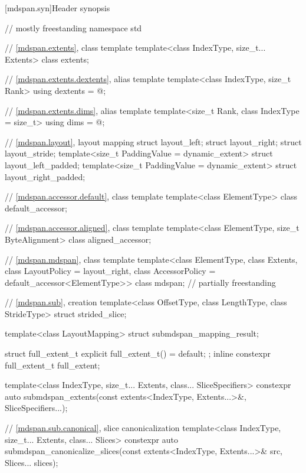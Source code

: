 [mdspan.syn]{Header  synopsis}

%
\begin{codeblock}
// mostly freestanding
namespace std {
  // \ref{mdspan.extents}, class template 
  template<class IndexType, size_t... Extents>
    class extents;

  // \ref{mdspan.extents.dextents}, alias template 
  template<class IndexType, size_t Rank>
    using dextents = @\seebelow@;

  // \ref{mdspan.extents.dims}, alias template 
  template<size_t Rank, class IndexType = size_t>
    using dims = @\seebelow@;

  // \ref{mdspan.layout}, layout mapping
  struct layout_left;
  struct layout_right;
  struct layout_stride;
  template<size_t PaddingValue = dynamic_extent>
    struct layout_left_padded;
  template<size_t PaddingValue = dynamic_extent>
    struct layout_right_padded;

  // \ref{mdspan.accessor.default}, class template 
  template<class ElementType>
    class default_accessor;

  // \ref{mdspan.accessor.aligned}, class template 
  template<class ElementType, size_t ByteAlignment>
    class aligned_accessor;

  // \ref{mdspan.mdspan}, class template 
  template<class ElementType, class Extents, class LayoutPolicy = layout_right,
           class AccessorPolicy = default_accessor<ElementType>>
    class mdspan;                                                           // partially freestanding

  // \ref{mdspan.sub},  creation
  template<class OffsetType, class LengthType, class StrideType>
    struct strided_slice;

  template<class LayoutMapping>
    struct submdspan_mapping_result;

  struct full_extent_t { explicit full_extent_t() = default; };
  inline constexpr full_extent_t full_extent{};

  template<class IndexType, size_t... Extents, class... SliceSpecifiers>
    constexpr auto submdspan_extents(const extents<IndexType, Extents...>&, SliceSpecifiers...);

  // \ref{mdspan.sub.canonical},  slice canonicalization
  template<class IndexType, size_t... Extents, class... Slices>
    constexpr auto submdspan_canonicalize_slices(const extents<IndexType, Extents...>& src,
                                                 Slices... slices);

}
\end{codeblock}
